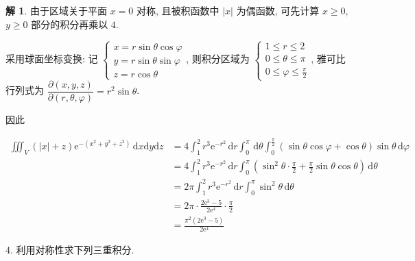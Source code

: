 \documentclass[a4paper,12pt]{article}
\theoremstyle{definition}
\newtheorem*{sol}{解}
\begin{document}
\begin{sol}
    由于区域关于平面 $x=0$ 对称, 且被积函数中 $|x|$ 为偶函数, 可先计算 $x\geq 0$, $y\geq 0$ 部分的积分再乘以 $4$.

    采用球面坐标变换: 记 $\begin{cases}
            x=r\sin\theta\cos\varphi \\
            y=r\sin\theta\sin\varphi \\
            z=r\cos\theta
        \end{cases}$, 则积分区域为 $\begin{cases}
            1\leq r\leq 2        \\
            0\leq \theta\leq \pi \\
            0\leq \varphi\leq \frac{\pi}{2}
        \end{cases}$, 雅可比行列式为 $\dfrac{\partial(x,y,z)}{\partial(r,\theta,\varphi)}=r^2\sin\theta$.

    因此

    \begin{align*}
        \iiint_V (|x|+z) \mathrm{e}^{-(x^2+y^2+z^2)} \, \mathrm{d}x\mathrm{d}y\mathrm{d}z
         & =4\int_1^2 r^3\mathrm{e}^{-r^2}\,\mathrm{d}r\int_0^{\pi}\,\mathrm{d}\theta\int_0^{\frac{\pi}{2}} (\sin\theta\cos\varphi+\cos\theta)\sin\theta\,\mathrm{d}\varphi \\
         & =4\int_1^2 r^3\mathrm{e}^{-r^2}\,\mathrm{d}r\int_0^{\pi}\left(\sin^2\theta\cdot\frac{\pi}{2}+\frac{\pi}{2}\sin\theta\cos\theta\right)\,\mathrm{d}\theta          \\
         & =2\pi\int_1^2 r^3\mathrm{e}^{-r^2}\,\mathrm{d}r\int_0^{\pi}\sin^2\theta\,\mathrm{d}\theta                                                                        \\
         & =2\pi\cdot\frac{2\mathrm{e}^3-5}{2\mathrm{e}^4}\cdot\frac{\pi}{2}                                                                                                \\
         & =\frac{\pi^2(2\mathrm{e}^3-5)}{2\mathrm{e}^4}
    \end{align*}
\end{sol}


4. 利用对称性求下列三重积分.
\end{document}
